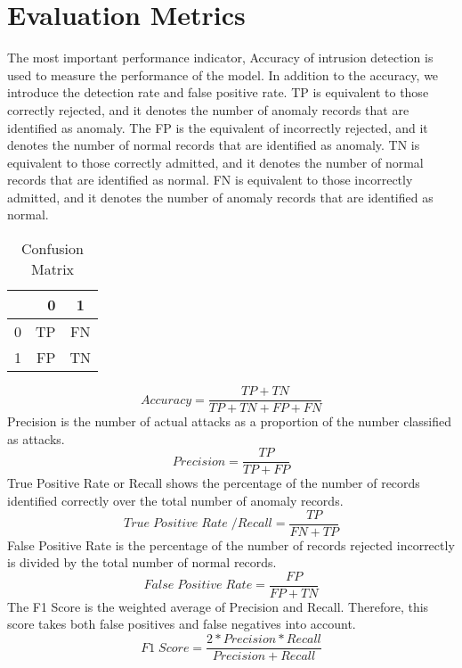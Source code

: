 \section{Evaluation Metrics}
\vspace{-18pt}
The most important performance indicator, Accuracy of intrusion detection is used to measure the performance of the model. In addition to the accuracy, we introduce the detection rate and false positive rate. TP is equivalent to those correctly rejected, and it denotes the number of anomaly records that are identified as anomaly. The FP is the equivalent of incorrectly rejected, and it denotes the number of normal records that are identified as anomaly. TN is equivalent to those correctly admitted, and it denotes the number of normal records that are identified as normal. FN is equivalent to those incorrectly admitted, and it denotes the number of anomaly records that are identified as normal.
\begin{table}[tbh]
	\centering
	\caption{Confusion Matrix}
	\begin{tabular}{|c|r|c|} %
		\hline %
		  &0 &1  \\
		\hline %
		0 &TP &FN  \\
		\hline %
		1 &FP &TN\\
		\hline
	\end{tabular}
	\label{Confusion Matrix}
\end{table}
\begin{equation}
	Accuracy = \frac{TP + TN}{TP + TN + FP + FN}
\end{equation} 
Precision is the number of actual attacks as a proportion of the number classified as attacks.
\begin{equation}
	Precision = \frac{TP}{TP + FP} 
\end{equation}
True Positive Rate or Recall shows the percentage of the number of records identified correctly over the total number of anomaly records.
\begin{equation}
	True\;Positive\;Rate\;/ Recall = \frac{TP}{FN + TP}
\end{equation}
False Positive Rate is the percentage of the number of records rejected incorrectly is divided by the total number of normal records.
\begin{equation}
	False\;Positive\;Rate = \frac{FP}{FP + TN}
\end{equation}
The F1 Score is the weighted average of Precision and Recall. Therefore, this score takes both false positives and false negatives into account.
\begin{equation}
	F1\;Score = \frac{2 * Precision * Recall}{Precision + Recall}
\end{equation}
